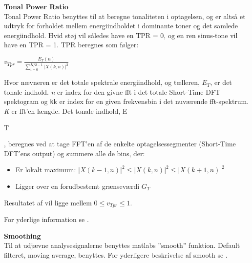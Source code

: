 \textbf{Tonal Power Ratio} \\
Tonal Power Ratio benyttes til at beregne tonaliteten i optagelsen, og er altså et udtryk for forholdet mellem energiindholdet i dominante toner og det samlede energiindhold. Hvid støj vil således have en TPR = 0, og en ren sinus-tone vil have en TPR = 1. TPR beregnes som følger: 
\begin{center}
${ v }_{ Tpr }=\frac { { E }_{ T }(n) }{ \sum _{ i=0 }^{ K/2-1 }{ { \left| X(k,n) \right|  }^{ 2 } }  } $
\end{center}

Hvor nævneren er det totale spektrale energiindhold, og tælleren, ${ E }_{ T }$, er det tonale indhold. 
\textit{n} er index for den givne fft i det totale Short-Time DFT spektogram og \verb+k+k er index for en given frekvensbin i det nuværende fft-spektrum. \textit{K} er fft'en længde.
Det tonale indhold, E\begin{tiny}T\end{tiny}, beregnes ved at tage FFT'en af de enkelte optagelsessegmenter (Short-Time DFT'ens output) og summere alle de bins, der:
\begin{itemize}
	\item Er lokalt maximum: ${ \left| X(k-1,n) \right|  }^{ 2 }\le { \left| X(k,n) \right|  }^{ 2 }\le { \left| X(k+1,n) \right|  }^{ 2 }$
	\item Ligger over en forudbestemt grænseværdi ${ G }_{ T }$
\end{itemize} 	

Resultatet af vil ligge mellem $0\le { v }_{ Tpr }\le 1$.

For yderlige information se \citep[pp. 56-57]{TPR_calc}.

\textbf{Smoothing} \\
Til at udjævne analysesignalerne benyttes matlabs ''smooth''  funktion. Default filteret, moving average, benyttes. For yderligere beskrivelse af smooth se \citep{website:smooth}.

